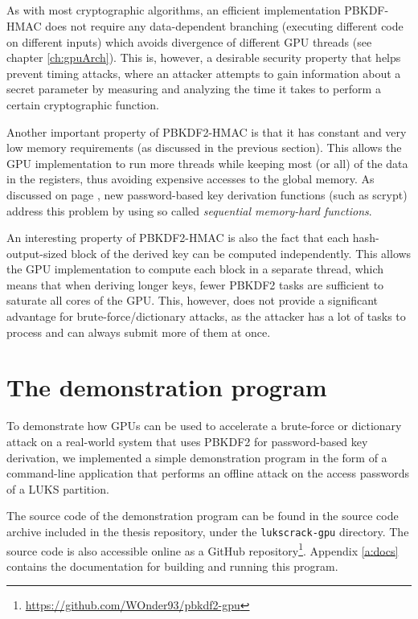 \documentclass[12pt,oneside]{fithesis2}
\begin{document}
      \paragraph*{}
      As with most cryptographic algorithms, an efficient implementation PBKDF-HMAC does not require any data-dependent branching (executing different code on different inputs) which avoids divergence of different GPU threads (see chapter \ref{ch:gpuArch}). This is, however, a desirable security property that helps prevent timing attacks, where an attacker attempts to gain information about a secret parameter by measuring and analyzing the time it takes to perform a certain cryptographic function.
      
      Another important property of PBKDF2-HMAC is that it has constant and very low memory requirements (as discussed in the previous section). This allows the GPU implementation to run more threads while keeping most (or all) of the data in the registers, thus avoiding expensive accesses to the global memory. As discussed on page \pageref{p:memoryHard}, new password-based key derivation functions (such as scrypt) address this problem by using so called \emph{sequential memory-hard functions}.
      
      An interesting property of PBKDF2-HMAC is also the fact that each hash-output-sized block of the derived key can be computed independently. This allows the GPU implementation to compute each block in a separate thread, which means that when deriving longer keys, fewer PBKDF2 tasks are sufficient to saturate all cores of the GPU. This, however, does not provide a significant advantage for brute-force/dictionary attacks, as the attacker has a lot of tasks to process and can always submit more of them at once.
      
    \chapter{The demonstration program}
      To demonstrate how GPUs can be used to accelerate a brute-force or dictionary attack on a real-world system that uses PBKDF2 for password-based key derivation, we implemented a simple demonstration program in the form of a command-line application that performs an offline attack on the access passwords of a LUKS partition.
      
      The source code of the demonstration program can be found in the source code archive included in the thesis repository, under the \texttt{lukscrack-gpu} directory. The source code is also accessible online as a GitHub repository\footnote{\url{https://github.com/WOnder93/pbkdf2-gpu}}. Appendix \ref{a:docs} contains the documentation for building and running this program.
      
\end{document}
